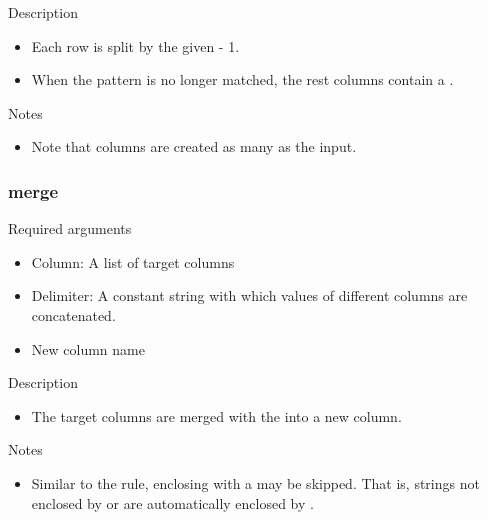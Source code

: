 \documentclass[letterpaper,10pt,english]{sphinxmanual}
\begin{document}
Description
\begin{itemize}
\item {} 
Each row is split by the given  - 1.

\item {} 
When the pattern is no longer matched, the rest columns contain a .

\end{itemize}

Notes
\begin{itemize}
\item {} 
Note that columns are created as many as the  input.

\end{itemize}


\subsubsection{merge}
\label{\detokenize{discovery/part07/rule_kinds:merge}}
Required arguments
\begin{itemize}
\item {} 
Column: A list of target columns

\item {} 
Delimiter: A constant string with which values of different columns are concatenated.

\item {} 
New column name

\end{itemize}

Description
\begin{itemize}
\item {} 
The target columns are merged with the  into a new column.

\end{itemize}

Notes
\begin{itemize}
\item {} 
Similar to the {\hyperref[\detokenize{discovery/part07/rule_kinds:replace}]{}} rule, enclosing with a  may be skipped. That is, strings not enclosed by \sphinxcode{\sphinxupquote{/}} or  are automatically enclosed by .

\end{itemize}
\end{document}
